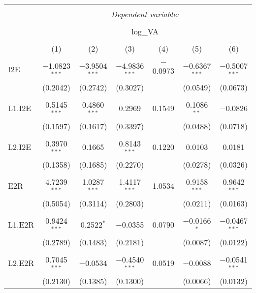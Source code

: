 
\begin{table}[!htbp] \centering 
  \caption{} 
  \label{} 
\begin{tabular}{@{\extracolsep{5pt}}lcccccc} 
\\[-1.8ex]\hline 
\hline \\[-1.8ex] 
 & \multicolumn{6}{c}{\textit{Dependent variable:}} \\ 
\cline{2-7} 
\\[-1.8ex] & \multicolumn{6}{c}{log\_VA} \\ 
\\[-1.8ex] & (1) & (2) & (3) & (4) & (5) & (6)\\ 
\hline \\[-1.8ex] 
 I2E & $-$1.0823$^{***}$ & $-$3.9504$^{***}$ & $-$4.9836$^{***}$ & $-$0.0973 & $-$0.6367$^{***}$ & $-$0.5007$^{***}$ \\ 
  & (0.2042) & (0.2742) & (0.3027) &  & (0.0549) & (0.0673) \\ 
  & & & & & & \\ 
 L1.I2E & 0.5145$^{***}$ & 0.4860$^{***}$ & 0.2969 & 0.1549 & 0.1086$^{**}$ & $-$0.0826 \\ 
  & (0.1597) & (0.1617) & (0.3397) &  & (0.0488) & (0.0718) \\ 
  & & & & & & \\ 
 L2.I2E & 0.3970$^{***}$ & 0.1665 & 0.8143$^{***}$ & 0.1220 & 0.0103 & 0.0181 \\ 
  & (0.1358) & (0.1685) & (0.2270) &  & (0.0278) & (0.0326) \\ 
  & & & & & & \\ 
 E2R & 4.7239$^{***}$ & 1.0287$^{***}$ & 1.4117$^{***}$ & 1.0534 & 0.9158$^{***}$ & 0.9642$^{***}$ \\ 
  & (0.5054) & (0.3114) & (0.2803) &  & (0.0211) & (0.0163) \\ 
  & & & & & & \\ 
 L1.E2R & 0.9424$^{***}$ & 0.2522$^{*}$ & $-$0.0355 & 0.0790 & $-$0.0166$^{*}$ & $-$0.0467$^{***}$ \\ 
  & (0.2789) & (0.1483) & (0.2181) &  & (0.0087) & (0.0122) \\ 
  & & & & & & \\ 
 L2.E2R & 0.7045$^{***}$ & $-$0.0534 & $-$0.4540$^{***}$ & 0.0519 & $-$0.0088 & $-$0.0541$^{***}$ \\ 
  & (0.2130) & (0.1385) & (0.1300) &  & (0.0066) & (0.0132) \\ 

\end{tabular}
\end{table}
